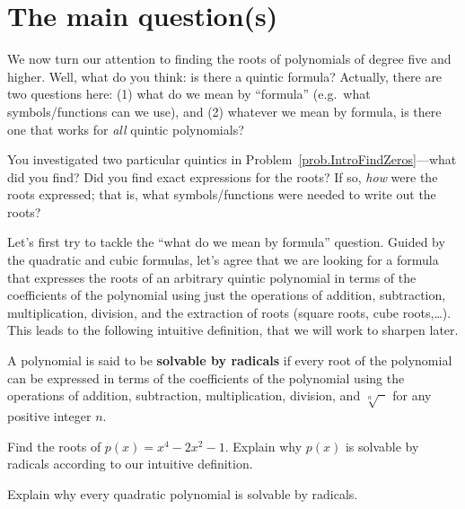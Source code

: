 \section{The main question(s)}
We now turn our attention to finding the roots of polynomials of degree five and higher. Well, what do you think: is there a quintic formula? Actually, there are two questions here: (1) what do we mean by ``formula'' (e.g.~what symbols/functions can we use), and (2) whatever we mean by formula, is there one that works for \emph{all} quintic polynomials?

You investigated two particular quintics in Problem~\ref{prob.IntroFindZeros}---what did you find? Did you find exact expressions for the roots? If so, \emph{how} were the roots expressed; that is, what symbols/functions were needed to write out the roots? 

Let's first try to tackle the ``what do we mean by formula'' question. Guided by the quadratic and cubic formulas, let's agree that we are looking for a formula that expresses the roots of an arbitrary quintic polynomial in terms of the coefficients of the polynomial using just the operations of addition, subtraction, multiplication, division, and the extraction of roots (square roots, cube roots,\ldots). This leads to the following intuitive definition, that we will work to sharpen later.

\begin{intuitivedef}
A polynomial is said to be \textbf{solvable by radicals} if every root of the polynomial can be expressed in terms of the coefficients of the polynomial using the operations of addition, subtraction, multiplication, division, and $\sqrt[n]{\phantom{x}}$ for any positive integer $n$.
\end{intuitivedef}

\begin{problem}
Find the roots of $p(x) = x^4 - 2x^2 -1$. Explain why $p(x)$ is solvable by radicals according to our intuitive definition.
\end{problem}

\begin{problem}
Explain why every quadratic polynomial is solvable by radicals.
\end{problem}


